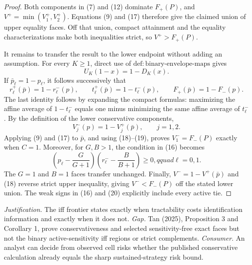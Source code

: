 \documentclass{article}
\begin{document}
\begin{proof}
Both components in (7) and (12) dominate \(F_+(P)\), and
\(V^+=\min(V_1^+,V_2^+)\).  Equations (9) and (17) therefore give the
claimed union of upper equality faces.  Off that union, compact
attainment and the equality characterizations make both inequalities
strict, so \(V^+>F_+(P)\).

It remains to transfer the result to the lower endpoint without adding
an assumption.  For every \(K\geq1\), direct use of
\(\mathrm{def{:}binary\text{-}envelope\text{-}maps}\) gives
\[
 U_K(1-x)=1-D_K(x).
\]
If \(\bar p_\ell=1-p_\ell\), it follows successively that
\[
 r_\ell^+(\bar p)=1-r_\ell^-(p),\qquad
 t_\ell^+(\bar p)=1-t_\ell^-(p),\qquad
 F_+(\bar p)=1-F_-(p).                                        \tag{18}
\]
The last identity follows by expanding the compact formulas: maximizing
the affine average of \(1-t_\ell^-\) equals one minus minimizing the
same affine average of \(t_\ell^-\).  By the definition of the lower
conservative components,
\[
 V_j^-(p)=1-V_j^+(\bar p),\qquad j=1,2.                        \tag{19}
\]
Applying (9) and (17) to \(\bar p\), and using (18)--(19), proves
\(V_1^-=F_-(P)\) exactly when \(C=1\).  Moreover, for \(G,B>1\), the
condition in (16) becomes
\[
 \left(p_\ell-\frac{G}{G+1}\right)
 \left(r_\ell^--\frac{B}{B+1}\right)\geq0,qquad \ell=0,1.    \tag{20}
\]
The \(G=1\) and \(B=1\) faces transfer unchanged.  Finally,
\(V^-=1-V^+(\bar p)\) and (18) reverse strict upper inequality, giving
\(V^-<F_-(P)\) off the stated lower union.  The weak signs in
(16) and (20) explicitly include every active tie.
\end{proof}
\par\smallskip\noindent \textit{Justification.} The iff frontier states exactly when tractability costs identification information and exactly when it does not. \textit{Gap.} Tan (2025), Proposition 3 and Corollary 1, prove conservativeness and selected sensitivity-free exact faces but not the binary active-sensitivity iff regions or strict complements. \textit{Consumer.} An analyst can decide from observed cell risks whether the published conservative calculation already equals the sharp sustained-strategy risk bound.
\end{document}
